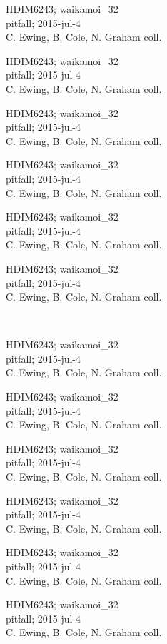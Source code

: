 \documentclass[2pt]{extarticle}
\begin{document}
\noindent
\parbox{0.16\textwidth}{\tiny \raggedright \rule[-0.3\baselineskip]{0pt}{10pt}HDIM6243; waikamoi\_32\\ pitfall; 2015-jul-4\\ C. Ewing, B. Cole, N. Graham coll.}
\parbox{0.16\textwidth}{\tiny \raggedright \rule[-0.3\baselineskip]{0pt}{10pt}HDIM6243; waikamoi\_32\\ pitfall; 2015-jul-4\\ C. Ewing, B. Cole, N. Graham coll.}
\parbox{0.16\textwidth}{\tiny \raggedright \rule[-0.3\baselineskip]{0pt}{10pt}HDIM6243; waikamoi\_32\\ pitfall; 2015-jul-4\\ C. Ewing, B. Cole, N. Graham coll.}
\parbox{0.16\textwidth}{\tiny \raggedright \rule[-0.3\baselineskip]{0pt}{10pt}HDIM6243; waikamoi\_32\\ pitfall; 2015-jul-4\\ C. Ewing, B. Cole, N. Graham coll.}
\parbox{0.16\textwidth}{\tiny \raggedright \rule[-0.3\baselineskip]{0pt}{10pt}HDIM6243; waikamoi\_32\\ pitfall; 2015-jul-4\\ C. Ewing, B. Cole, N. Graham coll.}
\parbox{0.16\textwidth}{\tiny \raggedright \rule[-0.3\baselineskip]{0pt}{10pt}HDIM6243; waikamoi\_32\\ pitfall; 2015-jul-4\\ C. Ewing, B. Cole, N. Graham coll.} \\ 
\vspace{0.001in} 

\noindent
\parbox{0.16\textwidth}{\tiny \raggedright \rule[-0.3\baselineskip]{0pt}{10pt}HDIM6243; waikamoi\_32\\ pitfall; 2015-jul-4\\ C. Ewing, B. Cole, N. Graham coll.}
\parbox{0.16\textwidth}{\tiny \raggedright \rule[-0.3\baselineskip]{0pt}{10pt}HDIM6243; waikamoi\_32\\ pitfall; 2015-jul-4\\ C. Ewing, B. Cole, N. Graham coll.}
\parbox{0.16\textwidth}{\tiny \raggedright \rule[-0.3\baselineskip]{0pt}{10pt}HDIM6243; waikamoi\_32\\ pitfall; 2015-jul-4\\ C. Ewing, B. Cole, N. Graham coll.}
\parbox{0.16\textwidth}{\tiny \raggedright \rule[-0.3\baselineskip]{0pt}{10pt}HDIM6243; waikamoi\_32\\ pitfall; 2015-jul-4\\ C. Ewing, B. Cole, N. Graham coll.}
\parbox{0.16\textwidth}{\tiny \raggedright \rule[-0.3\baselineskip]{0pt}{10pt}HDIM6243; waikamoi\_32\\ pitfall; 2015-jul-4\\ C. Ewing, B. Cole, N. Graham coll.}
\parbox{0.16\textwidth}{\tiny \raggedright \rule[-0.3\baselineskip]{0pt}{10pt}HDIM6243; waikamoi\_32\\ pitfall; 2015-jul-4\\ C. Ewing, B. Cole, N. Graham coll.} \\ 
\vspace{0.001in} 
\end{document}

